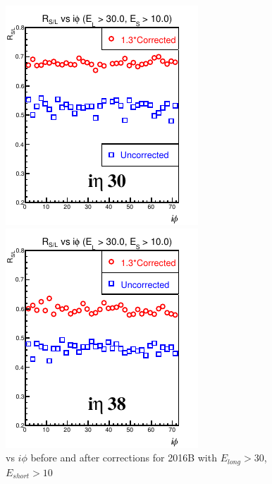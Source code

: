 \begin{figure}[!h] %
\begin{minipage}[c]{0.5\linewidth}
\centering
\includegraphics[width=0.7\linewidth]{../Figures/Chap2/ImageFiles_HF/Ratio/2016/Corrected/EnegyCut3010/ieta30Ecut1CorrectionEcut3.pdf}
\end{minipage}
\begin{minipage}[c]{0.5\linewidth}
\centering
\includegraphics[width=0.7\linewidth]{../Figures/Chap2/ImageFiles_HF/Ratio/2016/Corrected/EnegyCut3010/ieta38Ecut1CorrectionEcut3.pdf}
\end{minipage}
\caption{\ratiosl vs $i\phi$ before and after corrections for 2016B with $E_{long} > 30$, $E_{short} >10$}
\label{Ecut1CorrectionEcut3}
\end{figure}

